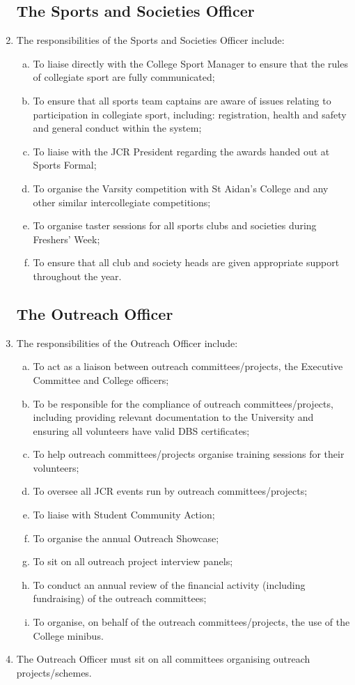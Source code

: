 \documentclass[12pt]{article}  %
\begin{document}
\begin{enumerate}
    \subsection{The Sports and Societies Officer}
    \item The responsibilities of the Sports and Societies Officer include:
    \begin{enumerate}[(a)]
        \item To liaise directly with the College Sport Manager to ensure that the rules of collegiate sport are fully communicated;
        \item To ensure that all sports team captains are aware of issues relating to participation in collegiate sport, including: registration, health and safety and general conduct within the system;
        \item To liaise with the JCR President regarding the awards handed out at Sports Formal;
        \item To organise the Varsity competition with St Aidan’s College and any other similar intercollegiate competitions;
        \item To organise taster sessions for all sports clubs and societies during Freshers’ Week;
        \item To ensure that all club and society heads are given appropriate support throughout the year.
    \end{enumerate}
    \subsection{The Outreach Officer}
    \item The responsibilities of the Outreach Officer include:
    \begin{enumerate}[(a)]
        \item To act as a liaison between outreach committees/projects, the Executive Committee and College officers;
        \item To be responsible for the compliance of outreach committees/projects, including providing relevant documentation to the University and ensuring all volunteers have valid DBS certificates;
        \item To help outreach committees/projects organise training sessions for their volunteers;
        \item To oversee all JCR events run by outreach committees/projects;
        \item To liaise with Student Community Action;
        \item To organise the annual Outreach Showcase;
        \item To sit on all outreach project interview panels;
        \item To conduct an annual review of the financial activity (including fundraising) of the outreach committees;
        \item To organise, on behalf of the outreach committees/projects, the use of the College minibus.
    \end{enumerate}
    \item The Outreach Officer must sit on all committees organising outreach projects/schemes.

\end{enumerate}
\end{document}
